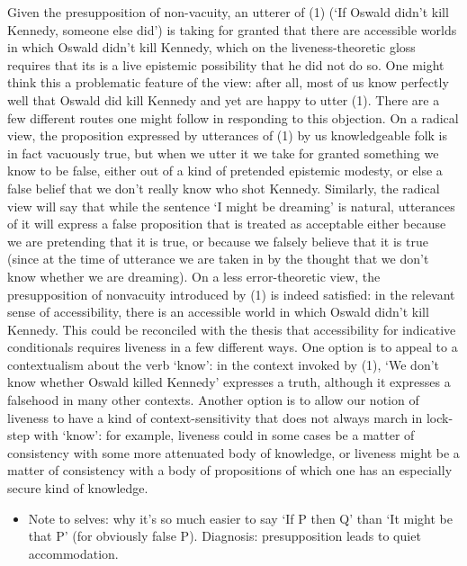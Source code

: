 Given the presupposition of non-vacuity, an utterer of (1) (`If Oswald
didn't kill Kennedy, someone else did') is taking for granted that there
are accessible worlds in which Oswald didn't kill Kennedy, which on the
liveness-theoretic gloss requires that its is a live epistemic
possibility that he did not do so. One might think this a problematic
feature of the view: after all, most of us know perfectly well that
Oswald did kill Kennedy and yet are happy to utter (1). There are a few
different routes one might follow in responding to this objection. On a
radical view, the proposition expressed by utterances of (1) by us
knowledgeable folk is in fact vacuously true, but when we utter it we
take for granted something we know to be false, either out of a kind of
pretended epistemic modesty, or else a false belief that we don't really
know who shot Kennedy. Similarly, the radical view will say that while
the sentence `I might be dreaming' is natural, utterances of it will
express a false proposition that is treated as acceptable either because
we are pretending that it is true, or because we falsely believe that it
is true (since at the time of utterance we are taken in by the thought
that we don't know whether we are dreaming). On a less error-theoretic
view, the presupposition of nonvacuity introduced by (1) is indeed
satisfied: in the relevant sense of accessibility, there is an
accessible world in which Oswald didn't kill Kennedy. This could be
reconciled with the thesis that accessibility for indicative
conditionals requires liveness in a few different ways. One option is to
appeal to a contextualism about the verb `know': in the context invoked
by (1), `We don't know whether Oswald killed Kennedy' expresses a truth,
although it expresses a falsehood in many other contexts. Another option
is to allow our notion of liveness to have a kind of context-sensitivity
that does not always march in lock-step with `know': for example,
liveness could in some cases be a matter of consistency with some more
attenuated body of knowledge, or liveness might be a matter of
consistency with a body of propositions of which one has an especially
secure kind of knowledge.

\begin{itemize}
\itemsep1pt\parskip0pt
\item
  Note to selves: why it's so much easier to say `If P then Q' than `It
  might be that P' (for obviously false P). Diagnosis: presupposition
  leads to quiet accommodation.
\end{itemize}

